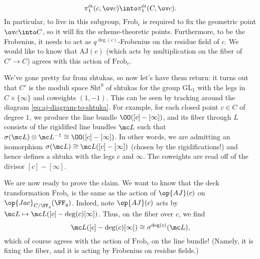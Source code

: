 \documentclass[../notes.tex]{subfiles}
\begin{document}
\[\pi_1^{\mathrm{\acute et}}(c,\ov c)\into\pi_1^{\mathrm{\acute et}}(C,\ov c).\]
In particular,  to live in this subgroup, $\mathrm{Frob}_c$ is required to fix the geometric point $\ov c\into C$, so it will fix the scheme-theoretic points. Furthermore, to be the Frobenius, it needs to act as $q^{\deg(c)}$-Frobenius on the residue field of $c$. We would like to know that $\mathrm{AJ}(c)$ (which acts by multiplication on the fiber of $C'\to C$) agrees with this action of $\mathrm{Frob}_c$.
\begin{remark}
	We've gone pretty far from shtukas, so now let's have them return: it turns out that $C'$ is the moduli space $\mathrm{Sht}^0$ of shtukas for the group $\mathrm{GL}_1$ with the legs in $C\times\{\infty\}$ and coweights $(1,-1)$. This can be seen by tracking around the diagram \eqref{eq:aj-diagram-to-shtuka}. For example, for each closed point $c\in C$ of degree $1$, we produce the line bundle $\OO([c]-[\infty])$, and its fiber through $L$ consists of the rigidified line bundles $\mc L$ such that $\sigma(\mc L)\otimes\mc L^{-1}\cong\OO([c]-[\infty])$. In other words, we are admitting an isomorphism $\sigma(\mc L)\cong\mc L([c]-[\infty])$ (chosen by the rigidifications!) and hence defines a shtuka with the legs $c$ and $\infty$. The coweights are read off of the divisor $[c]-[\infty]$.
\end{remark}
We are now ready to prove the claim. We want to know that the deck transformation $\mathrm{Frob}_c$ is the same as the action of $\op{AJ}(c)$ on $\op{Jac}_{C/\FF_q}(\FF_q)$. Indeed, note $\op{AJ}(c)$ acts by $\mc L\mapsto\mc L([c]-\deg(c)[\infty])$. Thus, on the fiber over $c$, we find
\[\mc L([c]-\deg(c)[\infty])\cong\sigma^{\deg(c)}(\mc L),\]
which of course agrees with the action of $\mathrm{Frob}_c$ on the line bundle! (Namely, it is fixing the fiber, and it is acting by Frobenius on residue fields.) 
\end{document}
